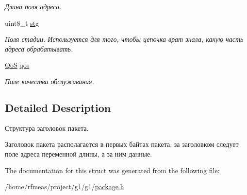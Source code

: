 \begin{DoxyCompactItemize}
\begin{DoxyCompactList}\small\item\em Длина поля адреса. \end{DoxyCompactList}\item 
uint8\+\_\+t \hyperlink{structg1_1_1package__header_ade59c95e617ca8789a408c9aaa0ab088}{stg}\hypertarget{structg1_1_1package__header_ade59c95e617ca8789a408c9aaa0ab088}{}\label{structg1_1_1package__header_ade59c95e617ca8789a408c9aaa0ab088}

\begin{DoxyCompactList}\small\item\em Поля стадии. Используется для того, чтобы цепочка врат знала, какую часть адреса обрабатывать. \end{DoxyCompactList}\item 
\hyperlink{package_8h_a157fb77f1b8142697dc1b88efaae6a0a}{QoS} \hyperlink{structg1_1_1package__header_aea47ad75b2af7d91d1f460ff5887c751}{qos}\hypertarget{structg1_1_1package__header_aea47ad75b2af7d91d1f460ff5887c751}{}\label{structg1_1_1package__header_aea47ad75b2af7d91d1f460ff5887c751}

\begin{DoxyCompactList}\small\item\em Поле качества обслуживания. \end{DoxyCompactList}\end{DoxyCompactItemize}


\subsection{Detailed Description}
Структура заголовок пакета. 

Заголовок пакета располагается в первых байтах пакета. за заголовком следует поле адреса переменной длины, а за ним данные. 

The documentation for this struct was generated from the following file\+:\begin{DoxyCompactItemize}
\item 
/home/rfmeas/project/g1/g1/\hyperlink{package_8h}{package.\+h}\end{DoxyCompactItemize}
